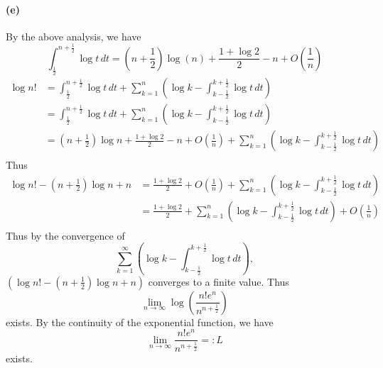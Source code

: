 \documentclass{article}
\def\to{\rightarrow}
\begin{document}
\paragraph[short]{(e)}
{
By the above analysis, we have
$$\int_{\frac{1}{2}}^{n+\frac{1}{2}}\log t \, dt=
\left(n+\frac{1}{2}\right)\log\left(n\right)+\frac{1+\log 2}{2}-n+O\left(\frac{1}{n}\right)$$
\begin{align*}
    \log n!&=\int_{\frac{1}{2}}^{n+\frac{1}{2}}\log t \, dt+\sum_{k=1}^{n}\left(\log k-\int_{k-\frac{1}{2}}^{k+\frac{1}{2}}\log t \, dt\right)\\
    &=\int_{\frac{1}{2}}^{n+\frac{1}{2}}\log t \, dt+\sum_{k=1}^{n}\left(\log k-\int_{k-\frac{1}{2}}^{k+\frac{1}{2}}\log t \, dt\right)\\
    &=\left(n+\frac{1}{2}\right)\log n+\frac{1+\log 2}{2}-n+O\left(\frac{1}{n}\right)+\sum_{k=1}^{n}\left(\log k-\int_{k-\frac{1}{2}}^{k+\frac{1}{2}}\log t \, dt\right)\\
\end{align*}
Thus
\begin{align*}
    \log n!-\left(n+\frac{1}{2}\right)\log n+n&=\frac{1+\log 2}{2}+O\left(\frac{1}{n}\right)+\sum_{k=1}^{n}\left(\log k-\int_{k-\frac{1}{2}}^{k+\frac{1}{2}}\log t \, dt\right)\\
    &=\frac{1+\log 2}{2}+\sum_{k=1}^{n}\left(\log k-\int_{k-\frac{1}{2}}^{k+\frac{1}{2}}\log t \, dt\right)+O\left(\frac{1}{n}\right)\\
\end{align*}
Thus by the convergence of 
$$\sum_{k=1}^{\infty}\left(\log k-\int_{k-\frac{1}{2}}^{k+\frac{1}{2}}\log t \, dt \right),$$
$\left(\log n!-\left(n+\frac{1}{2}\right)\log n+n\right)$
converges to a finite value.
Thus
$$\lim_{n\to\infty}\log \left(\frac{n!e^n}{n^{n+\frac{1}{2}}}\right)$$
exists.
By the continuity of the exponential function, we have
$$\lim_{n\to\infty}\frac{n!e^n}{n^{n+\frac{1}{2}}}=:L$$
exists.
}
\end{document}
